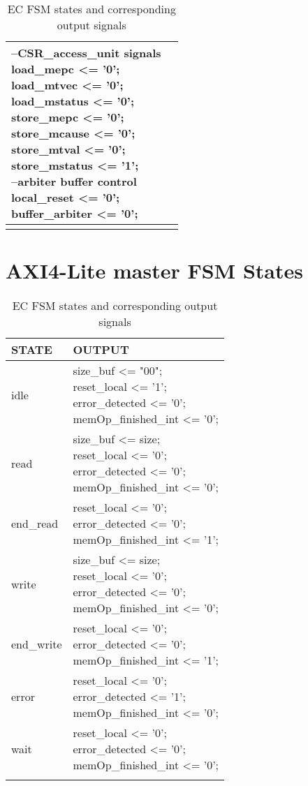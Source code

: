 \begin{longtable}{| p{} | p{} |}
{		--CSR\_access\_unit signals\\
		load\_mepc <= '0';\\
		load\_mtvec <= '0';\\
		load\_mstatus <= '0';\\
		store\_mepc <= '0';\\
		store\_mcause <= '0';\\
		store\_mtval <= '0';\\
		store\_mstatus <= '1';\\
		--arbiter buffer control\\
		local\_reset <= '0';\\
		buffer\_arbiter <= '0';}\\
	\hline
	\caption{EC FSM states and corresponding output signals}
	\label{EC_FSM}
\end{longtable}

\clearpage
\section{AXI4-Lite master FSM States}
\begin{longtable}{| p{} | p{} |}
	\hline
	\rowcolor{light-gray}
	\textbf{STATE} & \textbf{OUTPUT} \\
	\hline
	idle & \makecell{size\_buf <= "00";\\
		reset\_local <= '1';\\
		error\_detected <= '0';\\
		memOp\_finished\_int <= '0';}\\
	\hline
	read & \makecell{size\_buf <= size;\\
		reset\_local <= '0';\\
		error\_detected <= '0';\\
		memOp\_finished\_int <= '0';} \\
	\hline
	end\_read & \makecell{
		reset\_local <= '0';\\
		error\_detected <= '0';\\
		memOp\_finished\_int <= '1';} \\
	\hline
	write & \makecell{size\_buf <= size;\\
		reset\_local <= '0';\\
		error\_detected <= '0';\\
		memOp\_finished\_int <= '0';} \\
	\hline
	end\_write & \makecell{
		reset\_local <= '0';\\
		error\_detected <= '0';\\
		memOp\_finished\_int <= '1';} \\
	\hline
	error & \makecell{
		reset\_local <= '0';\\
		error\_detected <= '1';\\
		memOp\_finished\_int <= '0';} \\
	\hline
	wait & \makecell{
		reset\_local <= '0';\\
		error\_detected <= '0';\\
		memOp\_finished\_int <= '0';} \\
	\hline
	\caption{EC FSM states and corresponding output signals}
	\label{EC_FSM}
\end{longtable}
